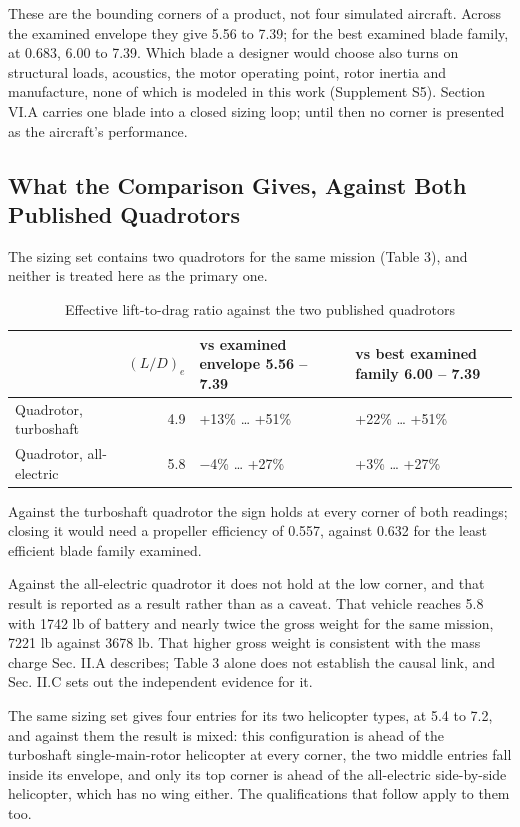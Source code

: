 \documentclass[journal]{new-aiaa}
\begin{document}
These are the bounding corners of a product, not four simulated aircraft. Across the examined envelope they give 5.56 to 7.39; for the best examined blade family, at 0.683, 6.00 to 7.39. Which blade a designer would choose also turns on structural loads, acoustics, the motor operating point, rotor inertia and manufacture, none of which is modeled in this work (Supplement S5). Section VI.A carries one blade into a closed sizing loop; until then no corner is presented as the aircraft's performance.

\subsection{What the Comparison Gives, Against Both Published Quadrotors}

The sizing set contains two quadrotors for the same mission (Table 3), and neither is treated here as the primary one.

\begin{table}[htbp]
\centering
\caption{Effective lift-to-drag ratio against the two published quadrotors}
\label{tab:3}
\small
\begin{tabularx}{\linewidth}{XrXX}
\hline
 & $(L/D)_e$ & vs examined envelope 5.56 -- 7.39 & vs best examined family 6.00 -- 7.39 \\ \hline
Quadrotor, turboshaft & 4.9 & +13\% \ldots{} +51\% & +22\% \ldots{} +51\% \\
Quadrotor, all-electric & 5.8 & $-$4\% \ldots{} +27\% & +3\% \ldots{} +27\% \\
\hline
\end{tabularx}
\end{table}

Against the turboshaft quadrotor the sign holds at every corner of both readings; closing it would need a propeller efficiency of 0.557, against 0.632 for the least efficient blade family examined.

Against the all-electric quadrotor it does not hold at the low corner, and that result is reported as a result rather than as a caveat. That vehicle reaches 5.8 with 1742 lb of battery and nearly twice the gross weight for the same mission, 7221 lb against 3678 lb. That higher gross weight is consistent with the mass charge Sec. II.A describes; Table 3 alone does not establish the causal link, and Sec. II.C sets out the independent evidence for it.

The same sizing set gives four entries for its two helicopter types, at 5.4 to 7.2, and against them the result is mixed: this configuration is ahead of the turboshaft single-main-rotor helicopter at every corner, the two middle entries fall inside its envelope, and only its top corner is ahead of the all-electric side-by-side helicopter, which has no wing either. The qualifications that follow apply to them too.
\end{document}
